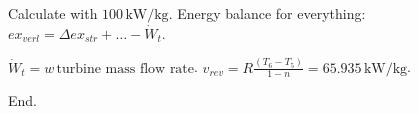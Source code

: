 Calculate with \( 100 \, \text{kW/kg} \).  
Energy balance for everything:  
\( ex_{verl} = \Delta ex_{str} + \dots - \dot{W}_t \).  

\( \dot{W}_t = w \, \text{turbine mass flow rate} \).  
\( v_{rev} = R \frac{(T_6 - T_5)}{1 - n} = 65.935 \, \text{kW/kg} \).  

End.